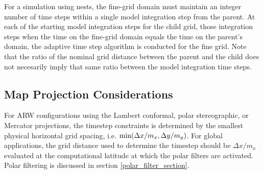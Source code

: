 For a simulation using nests, the fine-grid domain must maintain an integer number of 
time steps within a single model integration step from the parent.  At each of 
the starting
model integration steps for the child grid, those integration steps when the time on the fine-grid 
domain equals the time
on the parent's domain, the adaptive time step algorithm is conducted for the fine grid.
Note that the ratio of the nominal grid distance between the parent and the child does not
necesarily imply that same ratio between the model integration time steps.


\subsection{Map Projection Considerations}
\label{global_considerations}

For ARW configurations using the Lambert conformal, polar stereographic,
or Mercator projections, the timestep constraints is determined by
the smallest physical horizontal grid spacing,
i.e. $\hbox{min}(\Delta x/m_x, \Delta y/m_y)$.  For global applications,
the grid distance used to determine the timestep should be $\Delta
x/m_x$ evaluated at the computational latitude at which the polar
filters are activated.  Polar filtering is discussed in section
\ref{polar_filter_section}.
